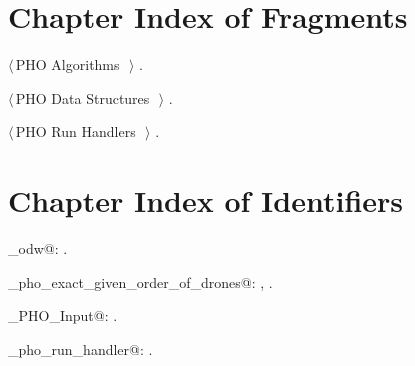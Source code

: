 \documentclass[12.0pt]{report}
\begin{document}
\section{Chapter Index of Fragments}

{\small\begin{list}{}{\setlength{\itemsep}{-\parsep}\setlength{\itemindent}{-\leftmargin}}
\item $\langle\,$PHO Algorithms\nobreak\ {\footnotesize {}}$\,\rangle$ {\footnotesize {\NWtxtRefIn} .}
\item $\langle\,$PHO Data Structures\nobreak\ {\footnotesize {}}$\,\rangle$ {\footnotesize {\NWtxtRefIn} .}
\item $\langle\,$PHO Run Handlers\nobreak\ {\footnotesize {}}$\,\rangle$ {\footnotesize {\NWtxtRefIn} .}
\end{list}}
\section{Chapter Index of Identifiers}

{\small\begin{list}{}{\setlength{\itemsep}{-\parsep}\setlength{\itemindent}{-\leftmargin}}
\item \verb@algo_odw@: \underline{}.
\item \verb@algo_pho_exact_given_order_of_drones@: , \underline{}.
\item \verb@Single_PHO_Input@: \underline{}.
\item \verb@single_pho_run_handler@: \underline{}.
\end{list}} 
\nocite{*} %
 

\end{document}
